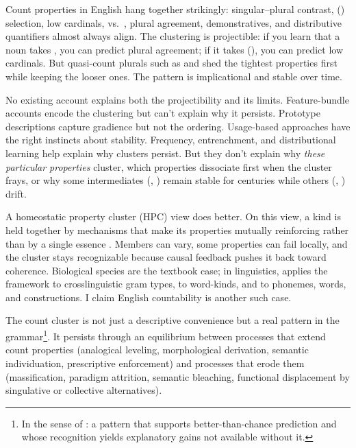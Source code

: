 \documentclass[12pt,a4paper]{article}
\begin{document}
Count properties in English hang together strikingly: singular--plural contrast, () selection, low cardinals,  vs.\ , plural agreement, demonstratives, and distributive quantifiers almost always align. The clustering is projectible: if you learn that a noun takes , you can predict plural agreement; if it takes (), you can predict low cardinals. But quasi-count plurals such as  and  shed the tightest properties first while keeping the looser ones. The pattern is implicational and stable over time.

No existing account explains both the projectibility and its limits. Feature-bundle accounts \citep{chomsky1965,allan1980} encode the clustering but can't explain why it persists. Prototype descriptions \citep{taylor2003,aarts2007} capture gradience but not the ordering. Usage-based approaches have the right instincts about stability. Frequency, entrenchment, and distributional learning help explain why clusters persist. But they don't explain why \textit{these particular properties} cluster, which properties dissociate first when the cluster frays, or why some intermediates (, ) remain stable for centuries while others (, ) drift.

A homeostatic property cluster (HPC) view does better. On this view, a kind is held together by mechanisms that make its properties mutually reinforcing rather than by a single essence \citep{boyd1991,khalidi2013}. Members can vary, some properties can fail locally, and the cluster stays recognizable because causal feedback pushes it back toward coherence. Biological species are the textbook case; in linguistics, \textcite{dahl2016} applies the framework to crosslinguistic gram types, \textcite{miller2021} to word-kinds, and \textcite{reynolds2025stack} to phonemes, words, and constructions. I claim English countability is another such case.

The count cluster is not just a descriptive convenience but a real pattern in the grammar\footnote{In the sense of \textcite{dennett1991}: a pattern that supports better-than-chance prediction and whose recognition yields explanatory gains not available without it.}. It persists through an equilibrium between processes that extend count properties (analogical leveling, morphological derivation, semantic individuation, prescriptive enforcement) and processes that erode them (massification, paradigm attrition, semantic bleaching, functional displacement by singulative or collective alternatives).
\end{document}
